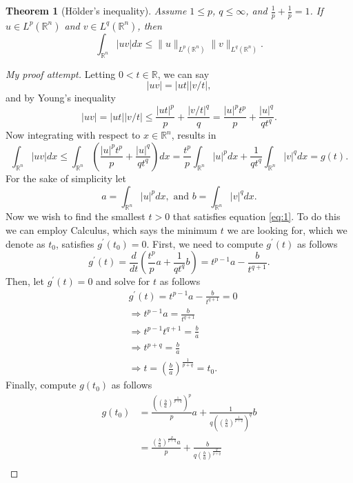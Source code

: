 \documentclass[11pt]{article}
\newtheorem{theorem}{Theorem}
\theoremstyle{definition}
\begin{document}
\begin{theorem}[H\"{o}lder's inequality]
Assume $1 \leq p$, $q \leq \infty$, and $\frac{1}{p} + \frac{1}{p} = 1$. If $u \in L^p(\mathbb{R}^n)$ and $v \in L^q(\mathbb{R}^n)$, then
	\[\int_{\mathbb{R}^n}|uv|dx \leq \|u\|_{L^p(\mathbb{R}^n)}\|v\|_{L^q(\mathbb{R}^n)}.\]
\end{theorem}
\begin{proof}[My proof attempt]
	Letting $0 < t \in \mathbb{R}$, we can say
	\[|uv| = |ut||v/t|,\]
	and by Young's inequality
	\[|uv| = |ut||v/t| \leq \frac{|ut|^p}{p} + \frac{|v/t|^q}{q} = \frac{|u|^pt^p}{p} + \frac{|u|^q}{qt^q}.\]
	Now integrating with respect to $x \in \mathbb{R}^n$, results in
	\begin{equation}
	\label{eq:1}
		\int_{\mathbb{R}^n}|uv|dx \leq  \int_{\mathbb{R}^n}\left(\frac{|u|^pt^p}{p} + \frac{|u|^q}{qt^q}\right)dx
		= \frac{t^p}{p}\int_{\mathbb{R}^n}|u|^pdx + \frac{1}{qt^q}\int_{\mathbb{R}^n}|v|^qdx = g(t).
	\end{equation}
	For the sake of simplicity let
	\[a = \int_{\mathbb{R}^n}|u|^pdx, \text{ and } b = \int_{\mathbb{R}^n}|v|^qdx.\]
	Now we wish to find the smallest $t > 0$ that satisfies equation \ref{eq:1}. To do this we can employ Calculus, which says the minimum $t$
	we are looking for, which we denote as $t_0$, satisfies $g^{\prime}(t_0) = 0$. First, we need to compute $g^{\prime}(t)$ as follows
	\[g^{\prime}(t) = \frac{d}{dt}\left(\frac{t^p}{p}a + \frac{1}{qt^q}b\right) = t^{p-1}a - \frac{b}{t^{q+1}}.\]
	Then, let $g^{\prime}(t) = 0$ and solve for $t$ as follows
	\begin{equation*}
		\begin{aligned}
			&g^{\prime}(t) = t^{p-1}a - \frac{b}{t^{q+1}} = 0 \\
			&\Rightarrow t^{p-1}a = \frac{b}{t^{q+1}} \\
			&\Rightarrow t^{p-1}t^{q+1} = \frac{b}{a} \\
			&\Rightarrow t^{p+q} = \frac{b}{a} \\
			&\Rightarrow t = \left(\frac{b}{a}\right)^{\frac{1}{p+q}} = t_0.
		\end{aligned}
	\end{equation*}
	Finally, compute $g(t_0)$ as follows
	\begin{equation*}
		\begin{aligned}
			g(t_0) &= \frac{\left(\left(\frac{b}{a}\right)^{\frac{1}{p+q}}\right)^p}{p}a + \frac{1}{q\left(\left(\frac{b}{a}\right)^{\frac{1}{p+q}}\right)^q}b \\
			       &= \frac{\left(\frac{b}{a}\right)^{\frac{p}{p+q}}a}{p} + \frac{b}{q\left(\frac{b}{a}\right)^{\frac{q}{p+q}}} \\

\end{aligned}
\end{equation*}
\end{proof}
\end{document}
